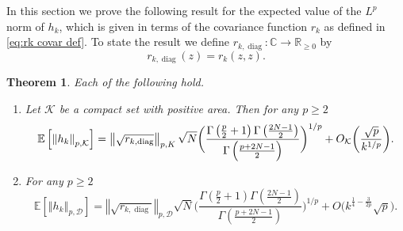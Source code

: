 \documentclass[12pt, a4paper]{amsart}
\newcommand{\tmop}[1]{\ensuremath{\operatorname{#1}}}
\newtheorem{theorem}{Theorem}[section]
\theoremstyle{definition}
\newcommand {\1} {\mathbf{1}}
\newcommand {\Dc} {\mathcal{D}}
\newcommand {\Kc} {\mathcal{K}}
\numberwithin{equation}{section}
\begin{document}
In this section we prove the following result for the expected value of the $L^p$ norm of $h_k$, which is given in terms of the covariance function $r_k$ as defined in
\eqref{eq:rk covar def}. To state the result we define $r_{k,\tmop{diag}}:\mathbb C \rightarrow \mathbb R_{\ge 0}$ by
\begin{equation} \label{eq:rkdiagdef}
r_{k,\tmop{diag}}(z)=r_k(z,z).
\end{equation}

\begin{theorem} \label{thm:expectationlpnorm}
Each of the following hold.
\begin{enumerate}
\item[i.] Let $\Kc$ be a compact set with positive area. Then for any $p \ge 2$
\[
\mathbb{E}\left[\left\Vert h_{k}\right\Vert _{p,\Kc}\right]=
 \left\Vert \sqrt{r_{k,\tmop{diag}}} \right\Vert_{p,\mathcal \Kc} \sqrt{N} \bigg(\frac{\Gamma\left(\frac{p}{2}+1\right)\Gamma\left(\frac{2N-1}{2}\right)}{\Gamma\left(\frac{p+2N-1}{2}\right)} \bigg)^{1/p}+O_{\Kc}\bigg( \frac{\sqrt{p}}{k^{1/p}}\bigg).
\]
\item[ii.] For any $p \ge 2$ 
\[
\mathbb{E}\left[\left\Vert h_{k}\right\Vert _{p,\Dc}\right]=
 \left\Vert \sqrt{r_{k,\tmop{diag}}} \right\Vert_{p,\Dc} \sqrt{N} \bigg(\frac{\Gamma\left(\frac{p}{2}+1\right)\Gamma\left(\frac{2N-1}{2}\right)}{\Gamma\left(\frac{p+2N-1}{2}\right)} \bigg)^{1/p}+O\big( k^{\frac14-\frac{3}{2p}}\sqrt{p}\big).
\]
\end{enumerate}

\end{theorem}




\end{document}

